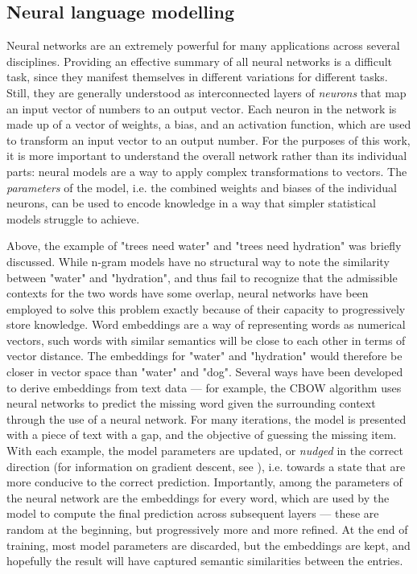 \subsection{Neural language modelling}

Neural networks are an extremely powerful for many applications across several disciplines. Providing an effective summary of all neural networks is a difficult task, since they manifest themselves in different variations for different tasks.
Still, they are generally understood as interconnected layers of \emph{neurons} that map an input vector of numbers to an output vector. Each neuron in the network is made up of a vector of weights, a bias, and an activation function, which are used to transform an input vector to an output number.
For the purposes of this work, it is more important to understand the overall network rather than its individual parts: neural models are a way to apply complex transformations to vectors.
The \emph{parameters} of the model, i.e. the combined weights and biases of the individual neurons, can be used to encode knowledge in a way that simpler statistical models struggle to achieve.

Above, the example of "trees need water" and "trees need hydration" was briefly discussed. While n-gram models have no structural way to note the similarity between "water" and "hydration", and thus fail to recognize that the admissible contexts for the two words have some overlap, neural networks have been employed to solve this problem exactly because of their capacity to progressively store knowledge.
Word embeddings \citep{selva2021review} are a way of representing words as numerical vectors, such words with similar semantics will be close to each other in terms of vector distance.  The embeddings for "water" and "hydration" would therefore be closer in vector space than "water" and "dog".
Several ways have been developed to derive embeddings from text data --- for example, the CBOW \citep{mikolov2013efficientestimationwordrepresentations} algorithm uses neural networks to predict the missing word given the surrounding context through the use of a neural network.
For many iterations, the model is presented with a piece of text with a gap, and the objective of guessing the missing item. With each example, the model parameters are updated, or \emph{nudged} in the correct direction (for information on gradient descent, see \citet{zhang2019gradientdescentbasedoptimization}), i.e. towards a state that are more conducive to the correct prediction.
Importantly, among the parameters of the neural network are the embeddings for every word, which are used by the model to compute the final prediction across subsequent layers --- these are random at the beginning, but progressively more and more refined.
At the end of training, most model parameters are discarded, but the embeddings are kept, and hopefully the result will have captured semantic similarities between the entries.

